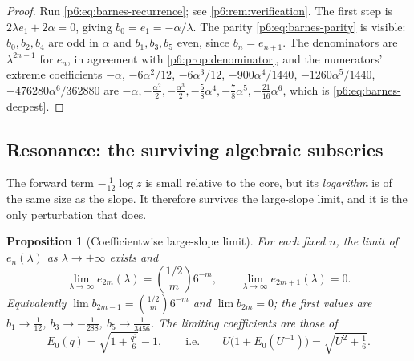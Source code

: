 \documentclass[11pt,a4paper,oneside]{book}
\theoremstyle{plain}
\newtheorem{proposition}[theorem]{Proposition}
\theoremstyle{definition}
\theoremstyle{remark}
\begin{document}
\begin{proof}
Run \eqref{p6:eq:barnes-recurrence}; see \cref{p6:rem:verification}.  The
first step is $2\lambda e_1+2\alpha=0$, giving $b_0=e_1=-\alpha/\lambda$.  The
parity \eqref{p6:eq:barnes-parity} is visible: $b_0,b_2,b_4$ are odd in
$\alpha$ and $b_1,b_3,b_5$ even, since $b_n=e_{n+1}$.  The denominators are
$\lambda^{2n-1}$ for $e_n$, in agreement with \cref{p6:prop:denominator}, and
the numerators' extreme coefficients $-\alpha$, $-6\alpha^{2}/12$,
$-6\alpha^{3}/12$, $-900\alpha^{4}/1440$, $-1260\alpha^{5}/1440$,
$-476280\alpha^{6}/362880$ are $-\alpha,-\tfrac{\alpha^2}2,-\tfrac{\alpha^3}2,
-\tfrac58\alpha^{4},-\tfrac78\alpha^{5},-\tfrac{21}{16}\alpha^{6}$, which is
\eqref{p6:eq:barnes-deepest}.
\end{proof}

\subsection{Resonance: the surviving algebraic subseries}

The forward term $-\tfrac1{12}\log z$ is small relative to the core, but its
\emph{logarithm} is of the same size as the slope.  It therefore survives the
large-slope limit, and it is the only perturbation that does.

\begin{proposition}[Coefficientwise large-slope limit]\label{p6:prop:resonance}
For each fixed $n$, the limit of $e_n(\lambda)$ as $\lambda\to+\infty$ exists
and
\begin{equation}\label{p6:eq:resonant-limit-coefficients}
 \lim_{\lambda\to\infty}e_{2m}(\lambda)=\binom{1/2}{m}6^{-m},
 \qquad
 \lim_{\lambda\to\infty}e_{2m+1}(\lambda)=0 .
\end{equation}
Equivalently $\lim b_{2m-1}=\binom{1/2}{m}6^{-m}$ and $\lim b_{2m}=0$; the
first values are $b_1\to\tfrac1{12}$, $b_3\to-\tfrac1{288}$,
$b_5\to\tfrac1{3456}$.  The limiting coefficients are those of
\begin{equation}\label{p6:eq:resonant-limit}
 E_0(q)=\sqrt{1+\tfrac{q^{2}}6}-1,
 \qquad\text{i.e.}\qquad
 U\bigl(1+E_0(U^{-1})\bigr)=\sqrt{U^{2}+\tfrac16}.
\end{equation}
\end{proposition}
\end{document}
